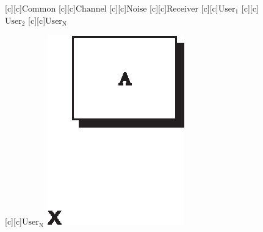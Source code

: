 \documentclass{article}
\begin{document}
\begin{figure}[htb]
  \begin{center}

    	[c]{$\mathrm{Common}$}
        [c][c]{$\mathrm{Channel}$}
        [c][c]{$\mathrm{Noise}$}
	[c]{$\mathrm{Receiver}$}
        [c][c]{\hspace{5mm}$\mathrm{User_1}$}
        [c][c]{\hspace{5mm}$\mathrm{User_2}$}
        [c][c]{\hspace{5mm}$\mathrm{User_N}$}

[c][c]{\hspace{5mm}$\mathrm{User_N}$}
    \includegraphics{dummy_psfrag.eps}
    \end{center}
\end{figure}
\end{document}
